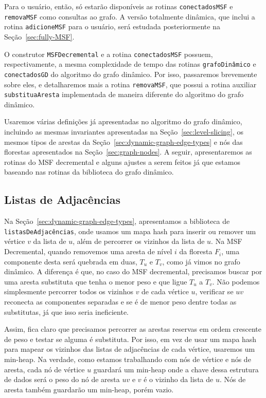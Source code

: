 Para o usuário, então, só estarão disponíveis as rotinas \texttt{conectadosMSF} e \texttt{removaMSF} como consultas ao grafo. A versão totalmente dinâmica, que inclui a rotina \texttt{adicioneMSF} para o usuário, será estudada posteriormente na Seção~\ref{sec:fully-MSF}.

O construtor \texttt{MSFDecremental} e a rotina \texttt{conectadosMSF} possuem, respectivamente, a mesma complexidade de tempo das rotinas \texttt{grafoDinâmico} e \texttt{conectadosGD} do algoritmo do grafo dinâmico. Por isso, passaremos brevemente sobre eles, e detalharemos mais a rotina \texttt{removaMSF}, que possui a rotina auxiliar \texttt{substituaAresta} implementada de maneira diferente do algoritmo do grafo dinâmico. 

Usaremos várias definições já apresentadas no algoritmo do grafo dinâmico, incluindo as mesmas invariantes apresentadas na Seção~\ref{sec:level-slicing}, os mesmos tipos de arestas da Seção~\ref{sec:dynamic-graph-edge-types} e nós das florestas apresentados na Seção~\ref{sec:graph-nodes}. A seguir, apresentaremos as rotinas do MSF decremental e alguns ajustes a serem feitos já que estamos baseando nas rotinas da biblioteca do grafo dinâmico. 

\subsection{Listas de Adjacências}
\label{sec:adjancency-lists-min-heap}

Na Seção~\ref{sec:dynamic-graph-edge-types}, apresentamos a biblioteca de \texttt{listasDeAdjacências}, onde usamos um mapa hash para inserir ou remover um vértice $v$ da lista de $u$, além de percorrer os vizinhos da lista de $u$. Na MSF Decremental, quando removemos uma aresta de nível $i$ da floresta $F_i$, uma componente desta será quebrada em duas, $T_u$ e $T_v$, como já vimos no grafo dinâmico. A diferença é que, no caso do MSF decremental, precisamos buscar por uma aresta substituta que tenha o menor peso e que ligue $T_u$ a $T_v$. Não podemos simplesmente percorrer todos os vizinhos $v$ de cada vértice $u$, verificar se $uv$ reconecta as componentes separadas e se é de menor peso dentre todas as substitutas, já que isso seria ineficiente.

Assim, fica claro que precisamos percorrer as arestas reservas em ordem crescente de peso e testar se alguma é substituta. Por isso, em vez de usar um mapa hash para mapear os vizinhos das listas de adjacências de cada vértice, usaremos um min-heap. Na verdade, como estamos trabalhando com nós de vértice e nós de aresta, cada nó de vértice $u$ guardará um min-heap onde a chave dessa estrutura de dados será o peso do nó de aresta $uv$ e $v$ é o vizinho da lista de $u$. Nós de aresta também guardarão um min-heap, porém vazio. 



